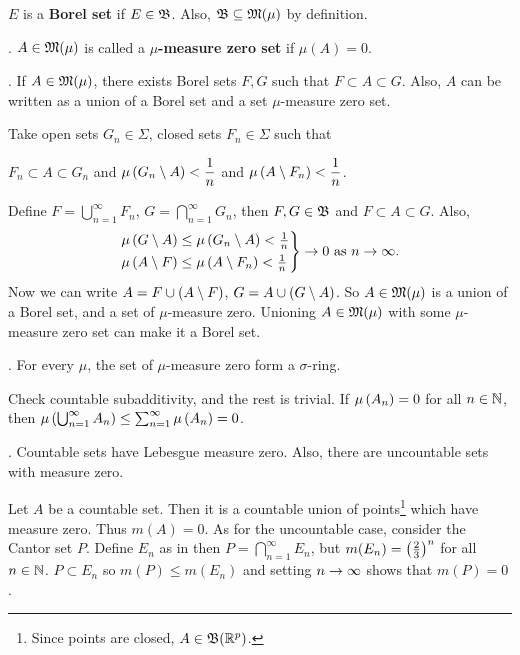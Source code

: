 \rmk \(E\) is a \textbf{Borel set} if \(E \in \mathfrak{B}\). Also, \(\mathfrak{B} \subseteq \mathfrak{M}(\mu)\) by definition.

.  \(A \in \mathfrak{M}(\mu)\) is called a \textbf{\(\mu\)-measure zero set} if \(\mu(A) = 0\).

\prop. If \(A \in \mathfrak{M}(\mu)\), there exists Borel sets \(F, G\) such that \(F \subset A \subset G\). Also, \(A\) can be written as a union of a Borel set and a set \(\mu\)-measure zero set.

\pf Take open sets \(G_n \in \Sigma\), closed sets \(F_n \in \Sigma\) such that
\begin{center}
    \(F_n \subset A \subset G_n\) and \(\displaystyle \mu\left( G_n \setminus A \right) < \frac{1}{n}\) and \(\displaystyle \mu\left( A \setminus F_n \right) < \frac{1}{n}\).
\end{center}
Define \(F = \bigcup_{n=1}^{\infty} F_n\), \(G = \bigcap_{n=1}^{\infty} G_n\), then \(F, G \in \mathfrak{B}\) and \(F \subset A \subset G\). Also,
\[
    \begin{rcases}
        \mu\left( G \setminus A \right)\leq \mu\left( G_n \setminus A \right) < \frac{1}{n} \\
        \mu\left( A \setminus F \right) \leq \mu\left( A \setminus F_n \right) < \frac{1}{n}
    \end{rcases} \rightarrow 0 \text{ as } n \rightarrow \infty.
\]
Now we can write \(A = F \cup (A \setminus F)\), \(G = A \cup (G \setminus A)\). So \(A \in \mathfrak{M}(\mu)\) is a union of a Borel set, and a set of \(\mu\)-measure zero. Unioning \(A\in \mathfrak{M}(\mu)\) with some \(\mu\)-measure zero set can make it a Borel set.

\prop. For every \(\mu\), the set of \(\mu\)-measure zero form a \(\sigma\)-ring.

\pf Check countable subadditivity, and the rest is trivial. If \(\mu\left( A_n \right) = 0\) for all \(n\in \mathbb{N}\), then \(\mu\left( \bigcup_{n=1}^{\infty} A_n \right) \leq \sum_{n=1}^{\infty} \mu\left( A_n \right) = 0\).

\prop. Countable sets have Lebesgue measure zero. Also, there are uncountable sets with measure zero.

\pf Let \(A\) be a countable set. Then it is a countable union of points\footnote{Since points are closed, \(A \in \mathfrak{B}(\mathbb{R}^p)\).} which have measure zero. Thus \(m(A) = 0\). As for the uncountable case, consider the Cantor set \(P\). Define \(E_n\) as in {} then \(P = \bigcap_{n=1}^{\infty} E_n\), but \(m(E_n) = \left( \frac{2}{3} \right)^n\) for all \(n \in \mathbb{N}\). \(P \subset E_n\) so \(m(P)\leq m(E_n)\) and setting \(n \rightarrow \infty\) shows that \(m(P) = 0\).

